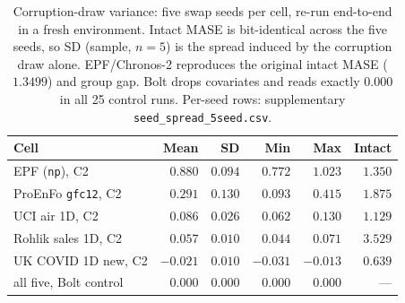 \begin{table}[t]
\centering
\small
\begin{tabular}{@{}lrrrrr@{}}
\toprule
Cell & Mean & SD & Min & Max & Intact \\
\midrule
EPF (\texttt{np}), C2 & $0.880$ & $0.094$ & $0.772$ & $1.023$ & $1.350$ \\
ProEnFo \texttt{gfc12}, C2 & $0.291$ & $0.130$ & $0.093$ & $0.415$ & $1.875$ \\
UCI air 1D, C2 & $0.086$ & $0.026$ & $0.062$ & $0.130$ & $1.129$ \\
Rohlik sales 1D, C2 & $0.057$ & $0.010$ & $0.044$ & $0.071$ & $3.529$ \\
UK COVID 1D new, C2 & $-0.021$ & $0.010$ & $-0.031$ & $-0.013$ & $0.639$ \\
\midrule
all five, Bolt control & $0.000$ & $0.000$ & $0.000$ & $0.000$ & --- \\
\bottomrule
\end{tabular}
\caption{Corruption-draw variance: five swap seeds per cell, re-run end-to-end
in a fresh environment. Intact MASE is bit-identical across the five seeds, so
SD (sample, $n=5$) is the spread induced by the corruption draw alone.
EPF/Chronos-2 reproduces the original intact MASE ($1.3499$) and group gap.
Bolt drops covariates and reads exactly $0.000$ in all 25 control runs.
Per-seed rows: supplementary \texttt{seed\_spread\_5seed.csv}.}
\label{tab:seedspread}
\end{table}
